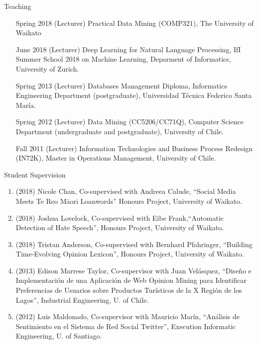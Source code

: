 \documentclass[handout]{beamer}
\begin{document}
\begin{frame}{Teaching}
\begin{scriptsize}
  \begin{enumerate}
\item [Spring 2018] (Lecturer) Practical Data Mining (COMP321), The University of Waikato

\item [June 2018] (Lecturer) Deep Learning for Natural Language Processing, IfI Summer School 2018 on Machine Learning,  Deparment of Informatics, University of Zurich. 

\item[Spring 2013] (Lecturer) Databases Management Diploma, Informatics Engineering Department (postgraduate), Universidad Técnica Federico Santa María.

\item[Spring 2012] (Lecturer) Data Mining (CC5206/CC71Q), Computer Science Department (undergraduate and postgraduate), University of Chile.

\item[Fall 2011]   (Lecturer) Information Technologies and Business Process Redesign (IN72K), Master in Operations Management, University of Chile.
  \end{enumerate} 
\end{scriptsize}

\end{frame}




\begin{frame}{Student Supervision}
\begin{scriptsize}
  \begin{enumerate}
\item (2018) Nicole Chan, Co-supervised with Andreea Calude, ``Social Media Meets Te Reo  M\={a}ori Loanwords''  Honours Project, University of Waikato. 
\item  (2018)  Joshua Lovelock, Co-supervised with Eibe Frank,``Automatic Detection of Hate Speech'', Honours Project, University of Waikato.
\item  (2018) Tristan Anderson, Co-supervised with Bernhard Pfahringer, ``Building Time-Evolving Opinion Lexicon'', Honours Project, University of Waikato.
\item (2013) Edison Marrese Taylor, Co-supervisor with Juan Velásquez, ``Diseño e Implementación de una Aplicación de Web Opinion Mining para Identificar Preferencias de Usuarios sobre Productos Turísticos de la X Región de los Lagos'', Industrial Engineering, U. of Chile.
\item (2012) Luis Maldonado, Co-supervisor with Mauricio Marín, ``Análisis de Sentimiento en el Sistema de Red Social Twitter'', Execution Informatic Engineering, U. of Santiago.
  \end{enumerate} 
\end{scriptsize}

\end{frame}
\end{document}
